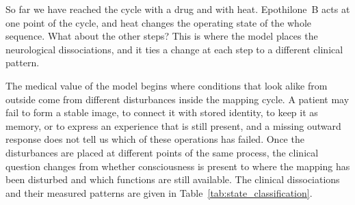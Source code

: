 So far we have reached the cycle with a drug and with heat. Epothilone~B acts at one
point of the cycle, and heat changes the operating state of the whole sequence. What
about the other steps? This is where the model places the neurological dissociations,
and it ties a change at each step to a different clinical pattern.

The medical value of the model begins where conditions that look alike from outside
come from different disturbances inside the mapping cycle. A patient may fail to form
a stable image, to connect it with stored identity, to keep it as memory, or to
express an experience that is still present, and a missing outward response does not
tell us which of these operations has failed. Once the disturbances are placed at
different points of the same process, the clinical question changes from whether
consciousness is present to where the mapping has been disturbed and which functions
are still available. The clinical dissociations and their measured patterns are
given in Table~\ref{tab:state_classification}.

